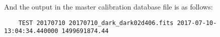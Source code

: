 \documentclass[11pt]{article}
\begin{document}
    And the output in the master calibration database file is as follows:

\begin{verbatim}
    TEST 20170710 20170710_dark_dark02d406.fits 2017-07-10-13:04:34.440000 1499691874.44
\end{verbatim}


    
    
    
    
\end{document}
